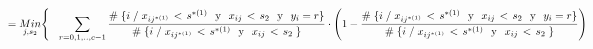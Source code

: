 \documentclass[
  11pt,
  a4paper,
]{article}
\begin{document}
\begin{gather*}
 \hspace{-2.5 cm}=     \underset{j  ,  s_2}  {Min} \Biggl\{     \hspace{0.3cm}  \sum_{r=0,1,..,c-1}^{}   \dfrac{\# \hspace{0.1 cm}\lbrace i \hspace{0.1 cm}/\hspace{0.1 cm}  x_{ij^{*(1)}} \hspace{0.05cm}   < \hspace{0.05cm} s^{*(1)} \hspace{0.25 cm}\text{y}\hspace{0.25 cm} x_{ij} \hspace{0.05cm}   < \hspace{0.05cm} s_2 \hspace{0.25 cm}\text{y}\hspace{0.25 cm} y_i = r \rbrace}{\# \hspace{0.1 cm}\lbrace i \hspace{0.1 cm} / \hspace{0.1 cm}  x_{ij^{*(1)}} \hspace{0.05cm}   < \hspace{0.05cm} s^{*(1)} \hspace{0.25 cm}\text{y}\hspace{0.25 cm} x_{ij} \hspace{0.05cm}   < \hspace{0.05cm} s_2  \hspace{0.1 cm} \rbrace } \cdot 
\left(   1 -  \dfrac{\# \hspace{0.1 cm}\lbrace i \hspace{0.1 cm}/\hspace{0.1 cm}  x_{ij^{*(1)}} \hspace{0.05cm}   < \hspace{0.05cm} s^{*(1)} \hspace{0.25 cm}\text{y}\hspace{0.25 cm} x_{ij} \hspace{0.05cm}   < \hspace{0.05cm} s_2 \hspace{0.25 cm}\text{y}\hspace{0.25 cm} y_i = r \rbrace}{\# \hspace{0.1 cm}\lbrace i \hspace{0.1 cm} / \hspace{0.1 cm}  x_{ij^{*(1)}} \hspace{0.05cm}   < \hspace{0.05cm} s^{*(1)} \hspace{0.25 cm}\text{y}\hspace{0.25 cm} x_{ij} \hspace{0.05cm}   < \hspace{0.05cm} s_2  \hspace{0.1 cm} \rbrace } \right) \\ \\ 

\end{gather*}
\end{document}
